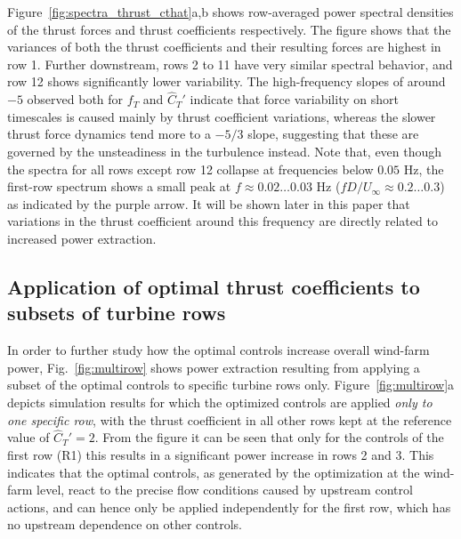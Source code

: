 \documentclass[wes, manuscript]{copernicus}
\begin{document}
Figure~\ref{fig:spectra_thrust_cthat}a,b shows row-averaged power spectral densities of the thrust forces and thrust coefficients respectively. The figure shows that the variances of both the thrust coefficients and their resulting forces are highest in row 1. Further downstream, rows 2 to 11 have very similar spectral behavior, and row 12 shows significantly lower variability. The high-frequency slopes of around $-5$ observed both for $f_T$ and $\widehat{C}_{T}'$ indicate that force variability on short timescales is caused mainly by thrust coefficient variations, whereas the slower thrust force dynamics tend more to a $-5/3$ slope, suggesting that these are governed by the unsteadiness in the turbulence instead. Note that, even though the spectra for all rows except row 12 collapse at frequencies below $0.05$ Hz, the first-row spectrum shows a small peak at $f \approx 0.02 \dots 0.03$ Hz ($f D / U_\infty \approx 0.2 \dots 0.3$) as indicated by the purple arrow. It will be shown later in this paper that variations in the thrust coefficient around this frequency are directly related to increased power extraction. 

\subsection{Application of optimal thrust coefficients to subsets of turbine rows}\label{sec:application_subset}

In order to further study how the optimal controls increase overall wind-farm power, Fig.~\ref{fig:multirow} shows power extraction resulting from applying a subset of the optimal controls to specific turbine rows only. Figure~\ref{fig:multirow}a depicts simulation results for which the  optimized controls are applied \emph{only to one specific row}, with the thrust coefficient in all other rows kept at the reference value of $\widehat{C}_{T}' = 2$. From the figure it can be seen that only for the controls of the first row (R1) this results in a significant power increase in rows 2 and 3. This indicates that the optimal controls, as generated by the optimization at the wind-farm level, react to the precise flow conditions caused by upstream control actions, and can hence only be applied independently for the first row, which has no upstream dependence on other controls. 
\end{document}
